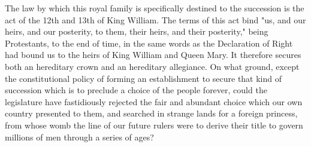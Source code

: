 The law by which this royal family is specifically destined to the succession is the act of the 12th and 13th of King William. The terms of this act bind "us, and our heirs, and our posterity, to them, their heirs, and their posterity," being Protestants, to the end of time, in the same words as the Declaration of Right had bound us to the heirs of King William and Queen Mary. It therefore secures both an hereditary crown and an hereditary allegiance. On what ground, except the constitutional policy of forming an establishment to secure that kind of succession which is to preclude a choice of the people forever, could the legislature have fastidiously rejected the fair and abundant choice which our own country presented to them, and searched in strange lands for a foreign princess, from whose womb the line of our future rulers were to derive their title to govern millions of men through a series of ages?

